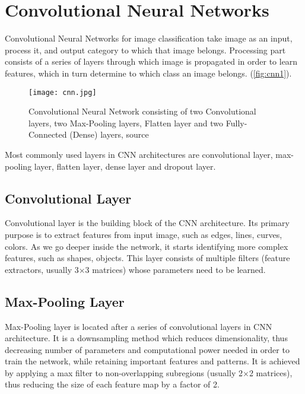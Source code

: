 \chapter{Convolutional Neural Networks}
\label{appx:simulation}

Convolutional Neural Networks for image classification \cite{krizhevsky2012imagenet} take image as an input, process it, and output category to which that image belongs. Processing part consists of a series of layers through which image is propagated in order to learn features, which in turn determine to which class an image belongs. (\textcolor{red}{\autoref{fig:cnn1}}).

\begin{figure}[h]
	\centering
	\texttt{[image: cnn.jpg]}
	\caption{Convolutional Neural Network consisting of two Convolutional layers, two Max-Pooling layers, Flatten layer and two Fully-Connected (Dense) layers, source \cite{alom2019state}}
	\label{fig:cnn1}
\end{figure}

Most commonly used layers in CNN architectures are convolutional layer, max-pooling layer, flatten layer, dense layer and dropout layer.

\section{Convolutional Layer}

Convolutional layer is the building block of the CNN architecture. Its primary purpose is to extract features from input image, such as edges, lines, curves, colors. As we go deeper inside the network, it starts identifying more complex features, such as shapes, objects. This layer consists of multiple filters (feature extractors, usually 3$\times$3 matrices) whose parameters need to be learned.
\section{Max-Pooling Layer}

Max-Pooling layer is located after a series of convolutional layers in CNN architecture. It is a downsampling method which reduces dimensionality, thus decreasing number of parameters and computational power needed in order to train the network, while retaining important features and patterns. It is achieved by applying a max filter to non-overlapping subregions (usually 2$\times$2 matrices), thus reducing the size of each feature map by a factor of 2.

